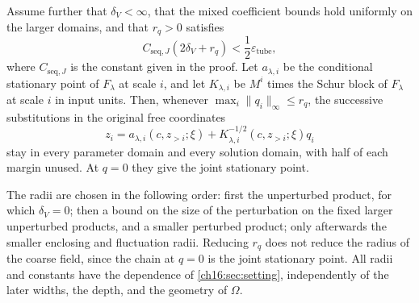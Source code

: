 \begin{lemma}
\begin{enumerate}
\[\]
Assume further that $\delta_V<\infty$, that the mixed coefficient bounds hold uniformly on the larger domains, and that $r_q>0$ satisfies
\[
 C_{\mathrm{seq},J}(2\delta_V+r_q)<\frac12\varepsilon_{\mathrm{tube}},
\]
where $C_{\mathrm{seq},J}$ is the constant given in the proof. Let $a_{\lambda,i}$ be the conditional stationary point of $F_\lambda$ at scale $i$, and let $K_{\lambda,i}$ be $M^i$ times the Schur block of $F_\lambda$ at scale $i$ in input units. Then, whenever $\max_i\|q_i\|_\infty\le r_q$, the successive substitutions in the original free coordinates
\[
 z_i=a_{\lambda,i}(c,z_{>i};\xi)
                      +K_{\lambda,i}^{-1/2}(c,z_{>i};\xi)q_i
\]
stay in every parameter domain and every solution domain, with half of each margin unused. At $q=0$ they give the joint stationary point.
\end{enumerate}
The radii are chosen in the following order: first the unperturbed product, for which $\delta_V=0$; then a bound on the size of the perturbation on the fixed larger unperturbed products, and a smaller perturbed product; only afterwards the smaller enclosing and fluctuation radii. Reducing $r_q$ does not reduce the radius of the coarse field, since the chain at $q=0$ is the joint stationary point. All radii and constants have the dependence of \cref{ch16:sec:setting}, independently of the later widths, the depth, and the geometry of $\Omega$.
\end{lemma}


